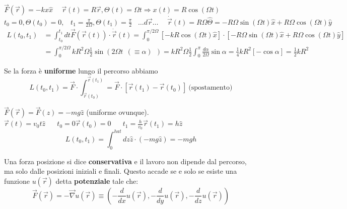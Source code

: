 \begin{example}
    $\vec{F}(\vec{r}) = -kx\hat{x} \hspace{15pt}\vec{r}(t) = R\vec{r}, \Theta(t) = \Omega t \Rightarrow x(t) = R \cos(\Omega t)$\\
    $t_0 = 0, \Theta(t_0) = 0, \hspace{10pt}t_1 = \frac{\pi}{2\Omega}, \Theta(t_1) = \frac{\pi}{2} \hspace{10pt} \dots d\vec{r}\dots \hspace{15pt} \dot{\vec{r}}(t) = R\Omega\hat{\Theta} = -R\Omega\sin(\Omega t)\hat{x} + R\Omega \cos(\Omega t)\hat{y}$
    \begin{equation*}
        \begin{split}
            L(t_0, t_1) & = \int_{t_0}^{t_1}dt \vec{F}(\vec{r}(t)) \cdot \dot{\vec{r}}(t) = \int_{0}^{\pi/2\Omega}[-k R \cos(\Omega t)\hat{x}] \cdot [-R \Omega \sin(\Omega t) \hat{x} + R\Omega \cos(\Omega t)\hat{y}]\\
                        & = \int_{0}^{\pi/2\Omega}kR^2 \Omega \frac{1}{2}\sin(2\Omega t \:\: (\equiv \alpha) \:\:) = kR^2 \Omega \frac{1}{2}\int_{0}^{\pi} \frac{d\alpha}{2\Omega}\sin\alpha = \frac{1}{4} kR^2[-\cos\alpha] = \frac{1}{2}kR^2 
        \end{split}
    \end{equation*}
\end{example}
\hspace{-15pt}Se la forza è \textbf{uniforme} lungo il percorso abbiamo
$$L(t_0, t_1) = \vec{F} \cdot \int_{\vec{r}(t_0)}^{\vec{r}(t_1)} = \vec{F} \cdot [\vec{r}(t_1) - \vec{r}(t_0)] \:\text{(spostamento)}$$
\begin{example}
    $\vec{F}(\vec{r}) = \vec{F}(z) = -mg\hat{z}$ (uniforme ovunque).\\
    $\vec{r}(t) = v_0 t\hat{z} \hspace{20pt} t_0 = 0 \vec{r}(t_0) = 0 \hspace{20pt} t_1 = \frac{h}{v_0} \vec{r}(t_1) = h\hat{z} \hspace{20pt}$
    $$L(t_0, t_1) = \int_{0}^{hat}dz \hat{z} \cdot (-mg\hat{z}) = -mgh$$
\end{example}
\hspace{-15pt}Una forza posizione si dice \textbf{conservativa} e il lavoro non dipende dal percorso, ma solo dalle posizioni iniziali e finali.
Questo accade se e solo se esiste una funzione $u(\vec{r})$ detta \textbf{potenziale} tale che:
$$\vec{F}(\vec{r}) = -\vec{\nabla}u(\vec{r}) \equiv (-\frac{d}{dx}u(\vec{r}), -\frac{d}{dy}u(\vec{r}), -\frac{d}{dz}u(\vec{r}))$$
